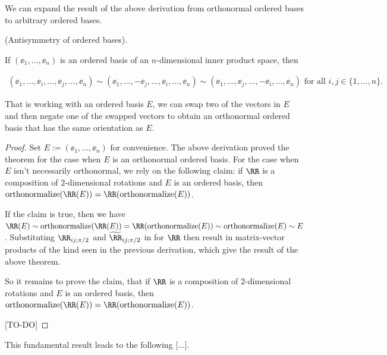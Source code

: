 We can expand the result of the above derivation from orthonormal ordered bases to arbitrary ordered bases.

\begin{theorem}
    (Antisymmetry of ordered bases).

    If $(\ee_1, ..., \ee_n)$ is an ordered basis of an $n$-dimensional inner product space, then
    
    \begin{align*}
        (\ee_1, ..., \ee_i, ..., \ee_j, ..., \ee_n)
        \sim
        (\ee_1, ..., -\ee_j, ..., \ee_i, ..., \ee_n)
        \sim
        (\ee_1, ..., \ee_j, ..., -\ee_i, ..., \ee_n) \text{ for all $i, j \in \{1, ..., n\}$}.
    \end{align*}

    That is working with an ordered basis $E$, we can swap two of the vectors in $E$ and then negate one of the swapped vectors to obtain an orthonormal ordered basis that has the same orientation as $E$.
\end{theorem}

\begin{proof}
    Set $E := (\ee_1, ..., \ee_n)$ for convenience. The above derivation proved the theorem for the case when $E$ is an orthonormal ordered basis. For the case when $E$ isn't necessarily orthonormal, we rely on the following claim: if $\RR$ is a composition of $2$-dimensional rotations and $E$ is an ordered basis, then $\text{orthonormalize}(\RR(E)) = \RR(\text{orthonormalize}(E))$.

    If the claim is true, then we have $\RR(E) \sim \text{orthonormalize}(\RR(E)) = \RR(\text{orthonormalize}(E)) \sim \text{orthonormalize}(E) \sim E$. Substituting $\RR_{ij;\pi/2}$ and $\widetilde{\RR}_{ij;\pi/2}$ in for $\RR$ then result in matrix-vector products of the kind seen in the previous derivation, which give the result of the above theorem.

    So it remains to prove the claim, that if $\RR$ is a composition of $2$-dimensional rotations and $E$ is an ordered basis, then $\text{orthonormalize}(\RR(E)) = \RR(\text{orthonormalize}(E))$.

    [TO-DO]
\end{proof}

This fundamental result leads to the following [...].

